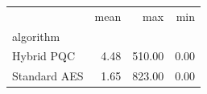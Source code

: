 \begin{tabular}{lrrr}
\toprule
 & mean & max & min \\
algorithm &  &  &  \\
\midrule
Hybrid PQC & 4.48 & 510.00 & 0.00 \\
Standard AES & 1.65 & 823.00 & 0.00 \\
\bottomrule
\end{tabular}
